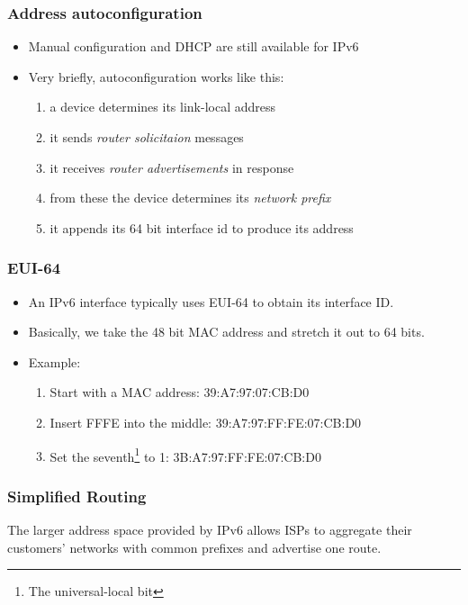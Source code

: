 \documentclass[10pt]{beamer}
\begin{document}
\begin{frame}
  \frametitle{Address autoconfiguration}

 \begin{itemize}
  \item Manual configuration and DHCP are still available for IPv6
  \item Very briefly, autoconfiguration works like this:
      \begin{enumerate}
        \item a device determines its link-local address
        \item it sends \emph{router solicitaion} messages
        \item it receives \emph{router advertisements} in response
        \item from these the device determines its \emph{network prefix}
        \item it appends its 64 bit interface id to produce its address
      \end{enumerate}
 \end{itemize}

\end{frame}



\begin{frame}
  \frametitle{EUI-64}

 \begin{itemize}
  \item An IPv6 interface typically uses EUI-64 to obtain its interface ID.
  \item Basically, we take the 48 bit MAC address and stretch it out to 64 bits.
  \item Example:
     \begin{enumerate}
       \item Start with a MAC address:  39:A7:97:07:CB:D0
       \item Insert FFFE into the middle:  39:A7:97:FF:FE:07:CB:D0
       \item Set the seventh\footnote{The universal-local bit} to 1:  3B:A7:97:FF:FE:07:CB:D0
     \end{enumerate}
 \end{itemize}

\end{frame}



\begin{frame}
  \frametitle{Simplified Routing}
   The larger address space provided by IPv6 allows ISPs to aggregate their customers' networks with common prefixes and advertise one route.
\end{frame}
\end{document}
